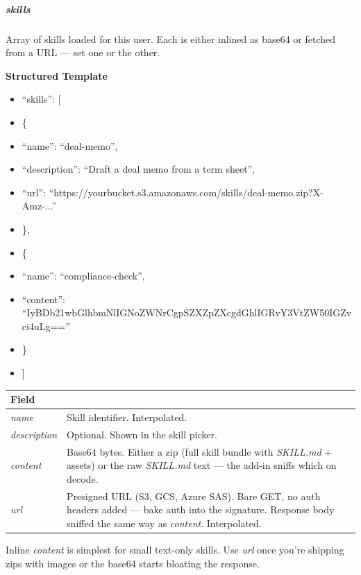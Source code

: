 \documentclass[11pt]{article}
\begin{document}
\subparagraph{\emph{skills}}\mbox{}\par

Array of skills loaded for this user. Each is either inlined as base64 or fetched from a URL — set one or the other.


\textbf{Structured Template}
\begin{itemize}[leftmargin=*,itemsep=2pt,topsep=2pt]
\item {} ``skills'': [
\item {} \{
\item {} ``name'': ``deal-memo'',
\item {} ``description'': ``Draft a deal memo from a term sheet'',
\item {} ``url'': ``https://yourbucket.s3.amazonaws.com/skills/deal-memo.zip?X-Amz-...''
\item {} \},
\item {} \{
\item {} ``name'': ``compliance-check'',
\item {} ``content'': ``IyBDb21wbGlhbmNlIGNoZWNrCgpSZXZpZXcgdGhlIGRvY3VtZW50IGZvci4uLg==''
\item {} \}
\item {} ]
\end{itemize}

\begingroup
\small
\setlength{\tabcolsep}{2pt}
\begin{longtable}{>{\RaggedRight\arraybackslash\hspace{0pt}}p{}>{\RaggedRight\arraybackslash\hspace{0pt}}p{}}
\toprule
{} \textbf{Field} & \textbf{} \\
\midrule
{} \emph{name} & Skill identifier. Interpolated. \\
{} \emph{description} & Optional. Shown in the skill picker. \\
{} \emph{content} & Base64 bytes. Either a zip (full skill bundle with \emph{SKILL.md} + assets) or the raw \emph{SKILL.md} text — the add-in sniffs which on decode. \\
{} \emph{url} & Presigned URL (S3, GCS, Azure SAS). Bare GET, no auth headers added — bake auth into the signature. Response body sniffed the same way as \emph{content}. Interpolated. \\
\bottomrule
\end{longtable}
\endgroup

Inline \emph{content} is simplest for small text-only skills. Use \emph{url} once you're shipping zips with images or the base64 starts bloating the response.
\end{document}
